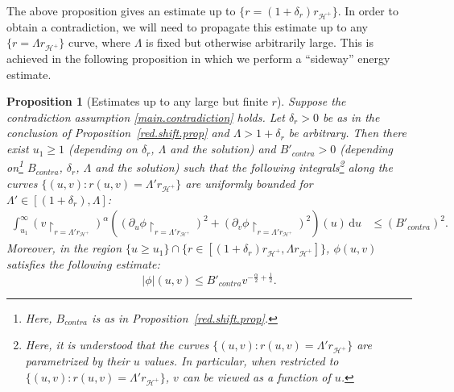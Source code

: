 \documentclass[10pt, reqno]{amsart}
\newtheorem{proposition}[theorem]{Proposition}
\theoremstyle{definition}
\theoremstyle{remark}
\theoremstyle{conjecture}
\numberwithin{equation}{section}
\newcommand{\ud}{\mathrm{d}}
\newcommand{\rd}{\partial}
\newcommand{\0}{\emptyset}
\newcommand{\alp}{\alpha}
\newcommand{\calH}{\mathcal H}
\newcommand{\f}{\frac}
\newcommand{\de}{\delta}
\newcommand{\EH}{\calH^{+}}
\begin{document}
The above proposition gives an estimate up to $\{r=(1+{\de_r})r_{\EH}\}$. In order to obtain a contradiction, we will need to propagate this estimate up to any $\{r=\Lambda r_{\EH}\}$ curve, where $\Lambda$ is fixed but otherwise arbitrarily large. This is achieved in the following proposition in which we perform a ``sideway'' energy estimate.

\begin{proposition}[Estimates up to any large but finite $r$]\label{contra.large.r}
Suppose the contradiction assumption \eqref{main.contradiction} holds. Let ${\de_r}>0$ be as in the conclusion of Proposition~\ref{red.shift.prop} and $\Lambda>1+{\de_r}$ be arbitrary. Then there exist $u_1\geq 1$ (depending on ${\de_r}$, $\Lambda$ and the solution) and $B'_{contra}>0$ (depending on\footnote{Here, $B_{contra}$ is as in Proposition~\ref{red.shift.prop}.} $B_{contra}$, ${\de_r}$, $\Lambda$ and the solution) such that the following integrals\footnote{Here, it is understood that the curves $\{(u,v): r(u,v)=\Lambda' r_{\EH}\}$ are parametrized by their $u$ values. In particular, when restricted to $\{(u,v): r(u,v)=\Lambda' r_{\EH}\}$, $v$ can be viewed as a function of $u$.} along the curves $\{(u,v): r(u,v)=\Lambda' r_{\EH}\}$ are uniformly bounded for $\Lambda'\in [(1+{\de_r}), \Lambda]$:
\begin{equation}\label{E.contra.prop}
\begin{split}
\int_{u_1}^\infty \left(v\restriction_{r=\Lambda' r_{\EH}}\right)^{\alp}\left((\rd_u\phi\restriction_{r=\Lambda' r_{\EH}})^2+(\rd_v\phi\restriction_{r=\Lambda' r_{\EH}} )^2\right)(u)\, \ud u &\leq (B'_{contra})^2.
\end{split}
\end{equation}
Moreover, in the region $\{u\geq u_1\}\cap\{r \in [(1+{\de_r})r_{\EH}, \Lambda r_{\EH}]\}$, $\phi(u,v)$ satisfies the following estimate:
\begin{equation}\label{pointwise.contra}
|\phi|(u,v)\leq B'_{contra} v^{-\f{\alp}{2}+\f 12}.
\end{equation}
\end{proposition}
\end{document}

